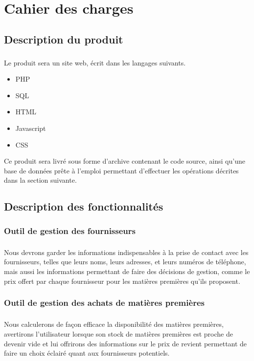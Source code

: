 \chapter{Cahier des charges}

\section{Description du produit}
    \paragraph{}
        Le produit sera un site web, écrit dans les langages suivants.
        \begin{itemize}
            \item PHP
            \item SQL
            \item HTML
            \item Javascript
            \item CSS
        \end{itemize}
        Ce produit sera livré sous forme d'archive contenant le code source,
        ainsi qu’une base de données prête à l’emploi permettant d'effectuer
        les opérations décrites dans la section suivante.

\section{Description des fonctionnalités}
    \subsection{Outil de gestion des fournisseurs}
        \paragraph{}
            Nous devrons garder les informations indispensables à la prise de
            contact avec les fournisseurs, telles que leurs noms, leurs adresses,
            et leurs numéros de téléphone, mais aussi les informations
            permettant de faire des décisions de gestion, comme le prix offert
            par chaque fournisseur pour les matières premières qu'ils proposent.
    \subsection{Outil de gestion des achats de matières premières}
        \paragraph{}
            Nous calculerons de façon efficace la disponibilité des matières
            premières, avertirons l'utilisateur lorsque son stock de matières
            premières est proche de devenir vide et lui offrirons  des
            informations sur le prix de revient permettant de faire un choix
            éclairé quant aux fournisseurs potentiels.
